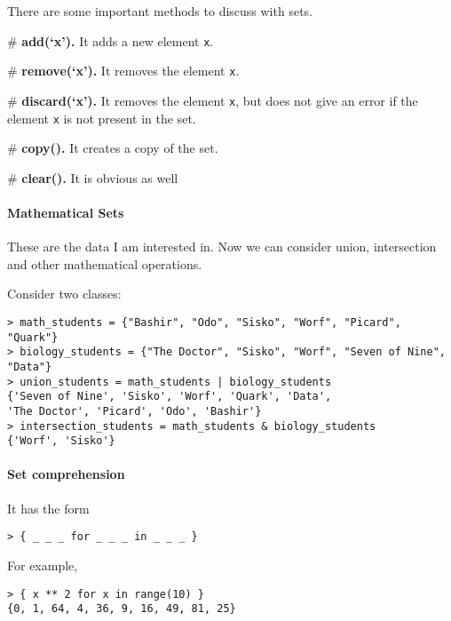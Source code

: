 There are some important methods to discuss with sets. 

\# {\bf add(`x').} It adds a new element \verb|x|. 

\# {\bf remove(`x').} It removes the element \verb|x|. 

\# {\bf discard(`x').} It removes the element \verb|x|, but does not give an error if the element \verb|x| is not present in the set.  

\# {\bf copy().} It creates a copy of the set. 

\# {\bf clear().} It is obvious as well

\paragraph{Mathematical Sets}

These are the data I am interested in. Now we can consider union, intersection and other mathematical operations. 

Consider two classes:
\begin{verbatim}
> math_students = {"Bashir", "Odo", "Sisko", "Worf", "Picard", "Quark"}
> biology_students = {"The Doctor", "Sisko", "Worf", "Seven of Nine", "Data"}
> union_students = math_students | biology_students
{'Seven of Nine', 'Sisko', 'Worf', 'Quark', 'Data', 
'The Doctor', 'Picard', 'Odo', 'Bashir'}
> intersection_students = math_students & biology_students
{'Worf', 'Sisko'}
\end{verbatim}

\paragraph{Set comprehension}

It has the form 
\begin{verbatim}
> { _ _ _ for _ _ _ in _ _ _ }
\end{verbatim}

For example, 
\begin{verbatim}
> { x ** 2 for x in range(10) }
{0, 1, 64, 4, 36, 9, 16, 49, 81, 25}
\end{verbatim}
